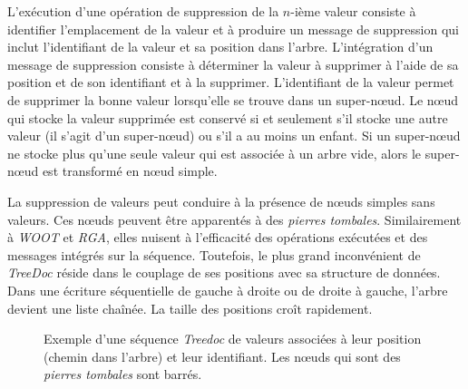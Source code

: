 L'exécution d'une opération de suppression de la $n$-ième valeur consiste à identifier l'emplacement de la valeur et à produire un message de suppression qui inclut l'identifiant de la valeur et sa position dans l'arbre.
L'intégration d'un message de suppression consiste à déterminer la valeur à supprimer à l'aide de sa position et de son identifiant et à la supprimer.
L'identifiant de la valeur permet de supprimer la bonne valeur lorsqu'elle se trouve dans un super-nœud.
Le nœud qui stocke la valeur supprimée est conservé si et seulement s'il stocke une autre valeur (il s'agit d'un super-nœud) ou s'il a au moins un enfant.
Si un super-nœud ne stocke plus qu'une seule valeur qui est associée à un arbre vide, alors le super-nœud est transformé en nœud simple.

La suppression de valeurs peut conduire à la présence de nœuds simples sans valeurs.
Ces nœuds peuvent être apparentés à des \emph{pierres tombales}.
Similairement à \emph{WOOT} et \emph{RGA}, elles nuisent à l'efficacité des opérations exécutées et des messages intégrés sur la séquence.
Toutefois, le plus grand inconvénient de \emph{TreeDoc} réside dans le couplage de ses positions avec sa structure de données.
Dans une écriture séquentielle de gauche à droite ou de droite à gauche, l'arbre devient une liste chaînée.
La taille des positions croît rapidement.

\begin{figure}[tb]
\centering
{}
\caption[Séquence \emph{Treedoc}]{Exemple d'une séquence \emph{Treedoc} de valeurs associées à leur position (chemin dans l'arbre) et leur identifiant.
Les nœuds qui sont des \emph{pierres tombales} sont barrés.}\label{fig:treedoc}
\end{figure}

